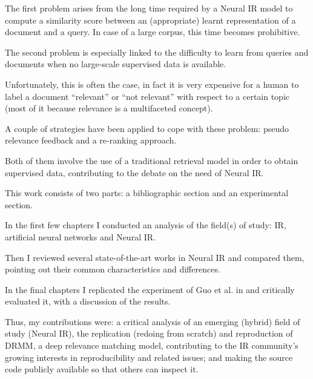 The first problem arises from the long time required by a Neural IR model to compute a similarity score between an (appropriate) learnt representation of a document and a query. In case of a large corpus, this time becomes prohibitive.

The second problem is especially linked to the difficulty to learn from queries and documents when no large-scale supervised data is available.

Unfortunately, this is often the case, in fact it is very expensive for a human to label a document ``relevant'' or ``not relevant'' with respect to a certain topic (most of it because relevance is a multifaceted concept).

A couple of strategies have been applied to cope with these problem: pseudo relevance feedback and a re-ranking approach.

Both of them involve the use of a traditional retrieval model in order to obtain supervised data, contributing to the debate on the need of Neural IR.

This work consists of two parts: a bibliographic section and an experimental section.

In the first few chapters I conducted an analysis of the field(s) of study: IR, artificial neural networks and Neural IR.

Then I reviewed several state-of-the-art works in Neural IR and compared them, pointing out their common characteristics and differences.

In the final chapters I replicated the experiment of Guo et al. in \cite{drmm} and critically evaluated it, with a discussion of the results.

Thus, my contributions were: a critical analysis of an emerging (hybrid) field of study (Neural IR), the replication (redoing from scratch) and reproduction of DRMM, a deep relevance matching model, contributing to the IR community's growing interests in reproducibility and related issues; and making the source code publicly available so that others can inspect it.